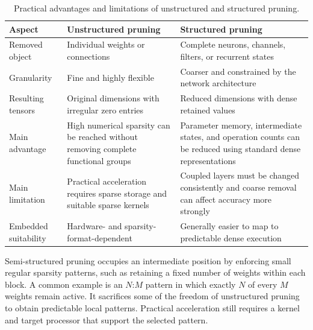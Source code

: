 \documentclass[
    a4paper,
    12pt,
    titlepage,
    bibliography=totoc,
    twoside=on,
    parskip=false,
    numbers=noenddot,
    cleardoublepage=empty,
    DIV=12,
    BCOR=12.0mm,
    headheight=36pt,
    headings=openright
]{scrreprt}
\begin{document}
\begin{table}[H]
    \centering
    \small
    \caption[Comparison of unstructured and structured pruning.]{Practical advantages and limitations of unstructured and structured pruning.}
    \label{tab:fundamental_pruning_granularity}
    \begin{tabularx}{\textwidth}{>{\raggedright\arraybackslash}p{3.0cm}YY}
        \toprule
        Aspect & Unstructured pruning & Structured pruning \\
        \midrule
        Removed object & Individual weights or connections & Complete neurons, channels, filters, or recurrent states \\
        Granularity & Fine and highly flexible & Coarser and constrained by the network architecture \\
        Resulting tensors & Original dimensions with irregular zero entries & Reduced dimensions with dense retained values \\
        Main advantage & High numerical sparsity can be reached without removing complete functional groups & Parameter memory, intermediate states, and operation counts can be reduced using standard dense representations \\
        Main limitation & Practical acceleration requires sparse storage and suitable sparse kernels & Coupled layers must be changed consistently and coarse removal can affect accuracy more strongly \\
        Embedded suitability & Hardware- and sparsity-format-dependent & Generally easier to map to predictable dense execution \\
        \bottomrule
    \end{tabularx}
\end{table}

Semi-structured pruning occupies an intermediate position by enforcing small regular sparsity patterns, such as retaining a fixed number of weights within each block. A common example is an $N$:$M$ pattern in which exactly $N$ of every $M$ weights remain active. It sacrifices some of the freedom of unstructured pruning to obtain predictable local patterns. Practical acceleration still requires a kernel and target processor that support the selected pattern.\autocite{chengSurveyDeepNeural2024,tensorflowPruningGuide2026}
\end{document}
